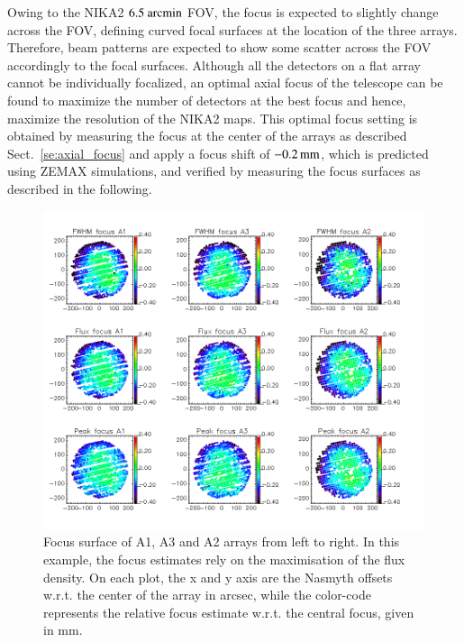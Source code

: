 \documentclass[traditionalabstract]{aa}
\begin{document}
\begin{appendix}
Owing to the NIKA2 $6.5~\rm{arcmin}$ FOV, the focus is expected to
slightly change across the FOV, defining curved focal surfaces at the
location of the three arrays. Therefore, beam patterns are expected to
show some scatter across the FOV accordingly to the focal
surfaces. Although all the detectors on a flat array cannot be
individually focalized, an optimal axial focus of the telescope can be
found to maximize the number of detectors at the best focus and hence,
maximize the resolution of the NIKA2 maps.
This optimal focus setting is obtained by measuring the focus at the
center of the arrays as described Sect.~\ref{se:axial_focus} and apply
a focus shift of $-0.2\,\rm{mm}$, which is 
predicted using ZEMAX simulations, and verified by measuring
the focus surfaces as described in the following.

\begin{figure}[!thbp]
\begin{center}
  \includegraphics[trim={0, 9.5cm, 0, 9.5cm}, clip=true, width=\linewidth]{Figures/fov_focus_mv_5.png}
\caption[Focus surfaces]{Focus surface of A1, A3 and A2 arrays from left to
  right. In this example, the focus estimates rely on the maximisation of the flux
  density. On each plot, the x and y axis are the Nasmyth offsets
  w.r.t. the center of the array in arcsec, while the color-code represents
  the relative focus estimate w.r.t. the central focus, given in mm.}
\label{fig:focus-surfaces}
\end{center}
\end{figure}


\end{appendix}
\end{document}
